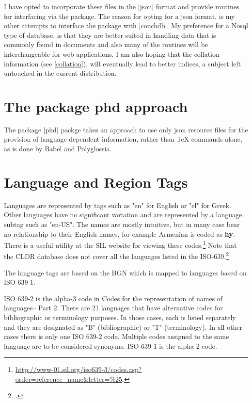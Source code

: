 I have opted to incorporate these files in the |json| format and provide routines for interfacing via the  package.  The reason for opting for a json format, is my other attempts to interface the package with |couchdb|.  My preference for a Nosql type of database, is that  they are better suited in handling data that is commonly  found in documents and also many of the routines will be interchangeable for web applications. I am also hoping that the collation information (see \ref{collation}), will eventually lead to better indices, a subject left untouched in the current distribution.

\section{The package phd approach}

The package |phd| packge takes an approach to use only json resource files for the provision of language dependent information, rather than TeX commands alone, as is done by Babel and Polyglossia. 

\section{Language and Region Tags}

Languages are represented by tags such as "en"  for English or "el" for Greek. Other languages have no significant variation and are represented by a language subtag such as "en-US".  The names are mostly intuitive, but in many case bear no relationship to their English names, for example Armenian is coded as \textbf{hy}. There is a useful utility at the SIL website for viewing these codes.\footnote{\protect\url{http://www-01.sil.org/iso639-3/codes.asp?order=reference_name&letter=\%25}.} Note that the CLDR database does not cover all the languages listed in the ISO-639.\footcite{iso639} 

The language tags are based on the BGN which is mapped to languages based on ISO-639-1.

ISO 639-2 is the alpha-3 code in Codes for the representation of names of languages-- Part 2. There are 21 languages that have alternative codes for bibliographic or terminology purposes. In those cases, each is listed separately and they are designated as "B" (bibliographic) or "T" (terminology). In all other cases there is only one ISO 639-2 code. Multiple codes assigned to the same language are to be considered synonyms. ISO 639-1 is the alpha-2 code.

